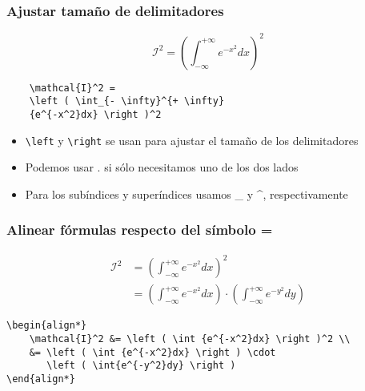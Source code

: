 \begin{frame}[fragile]
\frametitle{Ajustar tamaño de delimitadores}
    \begin{center}
    \begin{equation*}
    \mathcal{I}^2 = \left ( \int_{- \infty}^{+ \infty}{e^{-x^2}dx} \right )^2
    \end{equation*}
    \begin{verbatim}
    \mathcal{I}^2 =
    \left ( \int_{- \infty}^{+ \infty}
    {e^{-x^2}dx} \right )^2
    \end{verbatim}
    \end{center}
    \begin{itemize}
        \item{\verb|\left| y \verb|\right| se usan para ajustar el tamaño de los delimitadores} 
        \item{Podemos usar . si sólo necesitamos uno de los dos lados}
        \item{Para los subíndices y superíndices usamos \_ y \^{}, respectivamente}
    \end{itemize}
\end{frame}


\begin{frame}[fragile]
\frametitle{Alinear fórmulas respecto del símbolo =}

\begin{align*}
    \mathcal{I}^2 &= \left ( \int_{- \infty}^{+ \infty}{e^{-x^2}dx} \right )^2 \\
    &= \left ( \int_{- \infty}^{+ \infty}{e^{-x^2}dx} \right ) \cdot \left ( \int_{- \infty}^{+ \infty}{e^{-y^2}dy} \right )
\end{align*}

\begin{verbatim}
\begin{align*}
    \mathcal{I}^2 &= \left ( \int {e^{-x^2}dx} \right )^2 \\
    &= \left ( \int {e^{-x^2}dx} \right ) \cdot
       \left ( \int{e^{-y^2}dy} \right )
\end{align*}
\end{verbatim}
\end{frame}

